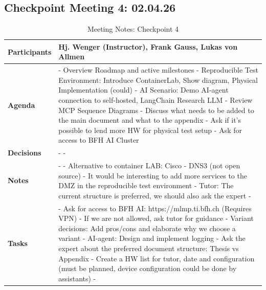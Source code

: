 \subsection{Checkpoint Meeting 4: 02.04.26}\label{subsec:checkpoint-meeting-4}

\begin{table}[H]
    \centering
    \begin{tabular}{p{2.5cm} | p{10cm}}

        \textbf{Participants} &
        Hj. Wenger (Instructor), Frank Gauss, Lukas von Allmen\\[6pt]
        \hline

        \textbf{Agenda} &
        - Overview Roadmap and active milestones\newline
        - Reproducible Test Environment: Introduce ContainerLab, Show diagram, Physical Implementation (could)\newline
        - \gls{AI} Scenario: Demo \gls{AI}-agent connection to self-hosted, LangChain Research \gls{LLM}\newline
        - Review \gls{MCP} Sequence Diagrams\newline
        - Discuss what needs to be added to the main document and what to the appendix\newline
        - Ask if it's possible to lend more HW for physical test setup\newline
        - Ask for access to BFH \gls{AI} Cluster\\[6pt]
        \hline

        \textbf{Decisions} &
        - \newline
        - \\
        \hline

        \textbf{Notes} &
        - \newline
        - Alternative to container LAB: Cisco - DNS3 (not open source)\newline
        - It would be interesting to add more services to the DMZ in the reproducible test environment\newline
        - Tutor: The current structure is preferred, we should also ask the expert\newline
        - \\
        \hline

        \textbf{Tasks} &
        - Ask for access to BFH \gls{AI}: https://mlmp.ti.bfh.ch (Requires VPN) - If we are not allowed, ask tutor for guidance\newline
        - Variant decisions: Add pros/cons and elaborate why we choose a variant\newline
        - \gls{AI}-agent: Design and implement logging\newline
        - Ask the expert about the preferred document structure: Thesis vs Appendix\newline
        - Create a HW list for tutor, date and configuration (must be planned, device configuration could be done by assistants)\newline
        - \\

    \end{tabular}
    \caption{Meeting Notes: Checkpoint 4}
    \label{tab:meeting-notes-checkpoint-4}
\end{table}
